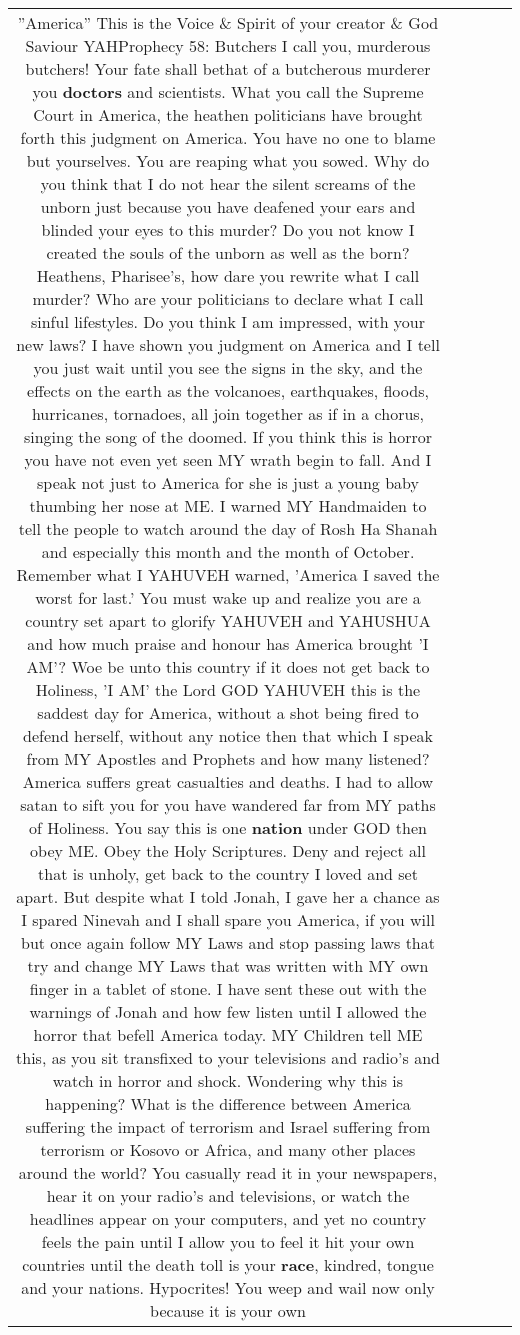 \documentclass[11pt]{article}
\newlength\mylength
\begin{document}
\begin{center}
\begin{longtable}{|C{.65\mylength}|C{.30\mylength}|C{.12\mylength}|C{.12\mylength}|C{.12\mylength}|}
  \small ''America'' This is the Voice \& Spirit of your creator \& God Saviour YAHProphecy 58: Butchers I call you, murderous butchers! Your fate shall bethat of a butcherous murderer you \textbf{doctors} and scientists. What you call the Supreme Court in America, the heathen politicians have brought forth this judgment on America. You have no one to blame but yourselves. You are reaping what you sowed. Why do you think that I do not hear the silent screams of the unborn just because you have deafened your ears and blinded your eyes to this murder? Do you not know I created the souls of the unborn as well as the born? Heathens, Pharisee's, how dare you rewrite what I call murder? Who are your politicians to declare what I call sinful lifestyles. Do you think I am impressed, with your new laws? I have shown you judgment on America and I tell you just wait until you see the signs in the sky, and the effects on the earth as the volcanoes, earthquakes, floods, hurricanes, tornadoes, all join together as if in a chorus, singing the song of the doomed. If you think this is horror you have not even yet seen MY wrath begin to fall. And I speak not just to America for she is just a young baby thumbing her nose at ME. I warned MY Handmaiden to tell the people to watch around the day of Rosh Ha Shanah and especially this month and the month of October. Remember what I YAHUVEH warned, 'America I saved the worst for last.' You must wake up and realize you are a country set apart to glorify YAHUVEH and YAHUSHUA and how much praise and honour has America brought 'I AM'? Woe be unto this country if it does not get back to Holiness, 'I AM' the Lord GOD YAHUVEH this is the saddest day for America, without a shot being fired to defend herself, without any notice then that which I speak from MY Apostles and Prophets and how many listened? America suffers great casualties and deaths. I had to allow satan to sift you for you have wandered far from MY paths of Holiness. You say this is one \textbf{nation} under GOD then obey ME. Obey the Holy Scriptures. Deny and reject all that is unholy, get back to the country I loved and set apart. But despite what I told Jonah, I gave her a chance as I spared Ninevah and I shall spare you America, if you will but once again follow MY Laws and stop passing laws that try and change MY Laws that was written with MY own finger in a tablet of stone. I have sent these out with the warnings of Jonah and how few listen until I allowed the horror that befell America today. MY Children tell ME this, as you sit transfixed to your televisions and radio's and watch in horror and shock. Wondering why this is happening? What is the difference between America suffering the impact of terrorism and Israel suffering from terrorism or Kosovo or Africa, and many other places around the world? You casually read it in your newspapers, hear it on your radio's and televisions, or watch the headlines appear on your computers, and yet no country feels the pain until I allow you to feel it hit your own countries until the death toll is your \textbf{race}, kindred, tongue and your nations. Hypocrites! You weep and wail now only because it is your own 
\end{longtable}
\end{center}
\end{document}
